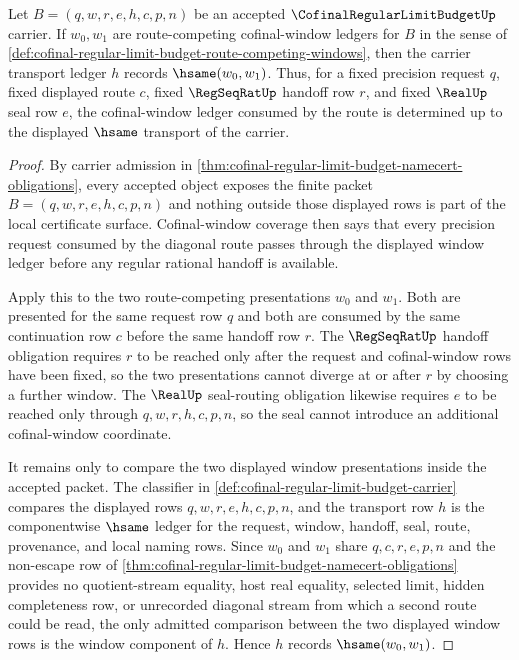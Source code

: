 \begin{theorem}
\label{thm:cofinal-regular-limit-budget-window-route-determinacy}
Let $B=(q,w,r,e,h,c,p,n)$ be an accepted $\CofinalRegularLimitBudgetUp$ carrier. If $w_0,w_1$ are route-competing cofinal-window ledgers for $B$ in the sense of \autoref{def:cofinal-regular-limit-budget-route-competing-windows}, then the carrier transport ledger $h$ records $\hsame(w_0,w_1)$. Thus, for a fixed precision request $q$, fixed displayed route $c$, fixed $\RegSeqRatUp$ handoff row $r$, and fixed $\RealUp$ seal row $e$, the cofinal-window ledger consumed by the route is determined up to the displayed $\hsame$ transport of the carrier.
\end{theorem}
\begin{proof}
By carrier admission in \autoref{thm:cofinal-regular-limit-budget-namecert-obligations}, every accepted object exposes the finite packet $B=(q,w,r,e,h,c,p,n)$ and nothing outside those displayed rows is part of the local certificate surface. Cofinal-window coverage then says that every precision request consumed by the diagonal route passes through the displayed window ledger before any regular rational handoff is available.

Apply this to the two route-competing presentations $w_0$ and $w_1$. Both are presented for the same request row $q$ and both are consumed by the same continuation row $c$ before the same handoff row $r$. The $\RegSeqRatUp$ handoff obligation requires $r$ to be reached only after the request and cofinal-window rows have been fixed, so the two presentations cannot diverge at or after $r$ by choosing a further window. The $\RealUp$ seal-routing obligation likewise requires $e$ to be reached only through $q,w,r,h,c,p,n$, so the seal cannot introduce an additional cofinal-window coordinate.

It remains only to compare the two displayed window presentations inside the accepted packet. The classifier in \autoref{def:cofinal-regular-limit-budget-carrier} compares the displayed rows $q,w,r,e,h,c,p,n$, and the transport row $h$ is the componentwise $\hsame$ ledger for the request, window, handoff, seal, route, provenance, and local naming rows. Since $w_0$ and $w_1$ share $q,c,r,e,p,n$ and the non-escape row of \autoref{thm:cofinal-regular-limit-budget-namecert-obligations} provides no quotient-stream equality, host real equality, selected limit, hidden completeness row, or unrecorded diagonal stream from which a second route could be read, the only admitted comparison between the two displayed window rows is the window component of $h$. Hence $h$ records $\hsame(w_0,w_1)$.
\end{proof}

